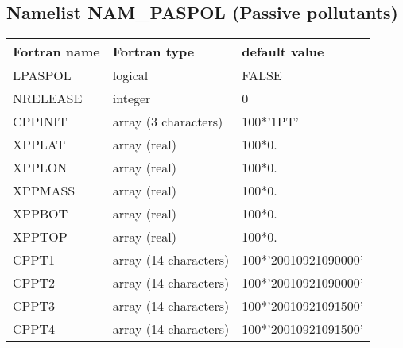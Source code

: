 \subsection{Namelist NAM\_PASPOL (Passive pollutants)}
\begin{longtable} {|p{}|p{}|p{}|}
\hline
Fortran name &  Fortran type & default value \\
\hline 
\endhead
\hline
\endfoot
 LPASPOL       & logical       & FALSE         \\
 NRELEASE      & integer       & 0             \\
 CPPINIT       & array (3 characters)& 100*'1PT'\\
 XPPLAT        & array (real)  & 100*0.   \\
 XPPLON        & array (real)  & 100*0.   \\
 XPPMASS       & array (real)  & 100*0.   \\
 XPPBOT        & array (real)  & 100*0.   \\
 XPPTOP        & array (real)  & 100*0.   \\
 CPPT1         & array (14 characters)& 100*'20010921090000'\\
 CPPT2         & array (14 characters)& 100*'20010921090000'\\
 CPPT3         & array (14 characters)& 100*'20010921091500'\\
 CPPT4         & array (14 characters)& 100*'20010921091500'\\
\end{longtable}

